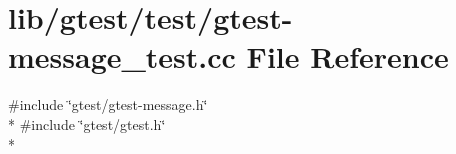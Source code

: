 \hypertarget{gtest-message__test_8cc}{\section{lib/gtest/test/gtest-\/message\-\_\-test.cc File Reference}
\label{gtest-message__test_8cc}
}
{\ttfamily \#include \char`\"{}gtest/gtest-\/message.\-h\char`\"{}}\\*
{\ttfamily \#include \char`\"{}gtest/gtest.\-h\char`\"{}}\\*
